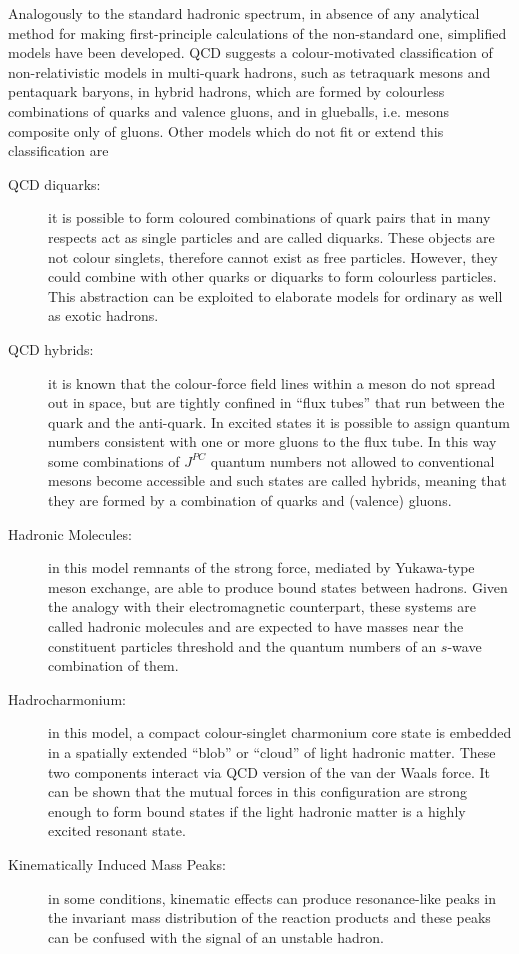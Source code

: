 Analogously to the standard hadronic spectrum, in absence of any analytical method for making first-principle calculations of the non-standard one, simplified models have been developed. QCD suggests a colour-motivated classification of non-relativistic models in multi-quark hadrons, such as tetraquark mesons and pentaquark baryons, in hybrid hadrons, which are formed by colourless combinations of quarks and valence gluons, and in glueballs, i.e. mesons composite only of gluons. Other models which do not fit or extend this classification are 
\begin{description}
  \item[QCD diquarks:] it is possible to form coloured combinations of quark pairs that in many respects act as single particles and are called diquarks. These objects are not colour singlets, therefore cannot exist as free particles. However, they could combine with other quarks or diquarks to form colourless particles. This abstraction can be exploited to elaborate models for ordinary as well as exotic hadrons.
  \item[QCD hybrids:] it is known that the colour-force field lines within a meson do not spread out in space, but are tightly confined in ``flux tubes'' that run between the quark and the anti-quark. In excited states it is possible to assign quantum numbers consistent with one or more gluons to the flux tube. In this way some combinations of $J^{P C}$ quantum numbers not allowed to conventional mesons become accessible and such states are called hybrids, meaning that they are formed by a combination of quarks and (valence) gluons.
  \item[Hadronic Molecules:] in this model remnants of the strong force, mediated by Yukawa-type meson exchange, are able to produce bound states between hadrons. Given the analogy with their electromagnetic counterpart, these systems are called hadronic molecules and are expected to have masses near the constituent particles threshold and the quantum numbers of an $s$-wave combination of them. 
  \item[Hadrocharmonium:] in this model, a compact colour-singlet charmonium core state is embedded in a spatially extended ``blob'' or ``cloud'' of light hadronic matter. These two components interact via QCD version of the van der Waals force. It can be shown that the mutual forces in this configuration are strong enough to form bound states if the light hadronic matter is a highly excited resonant state.
  \item[Kinematically Induced Mass Peaks:] in some conditions, kinematic effects can produce resonance-like peaks in the invariant mass distribution of the reaction products and these peaks can be confused with the signal of an unstable hadron.
\end{description}
 
